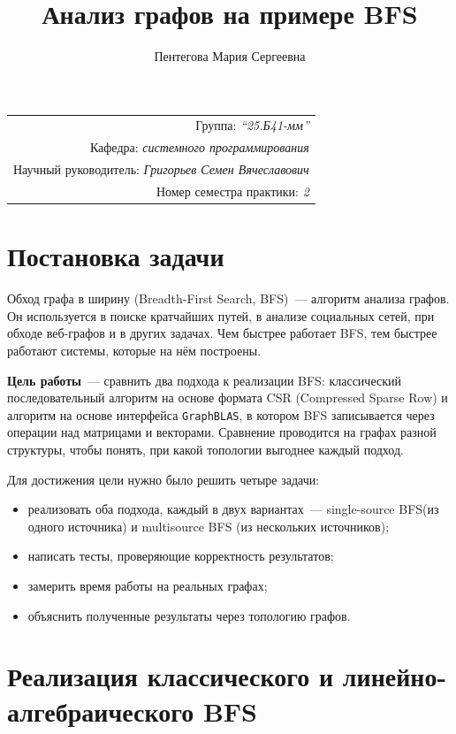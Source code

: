 \documentclass[a4paper]{article}
\title{Анализ графов на примере BFS}
\author{Пентегова Мария Сергеевна}
\date{}
\begin{document}
\maketitle
\begin{flushright}
\begin{tabular}{r}
    Группа: \emph{\enquote{25.Б41-мм}} \\
    Кафедра: \emph{системного программирования} \\
    Научный руководитель: \emph{Григорьев Семен Вячеславович} \\
    Номер семестра практики: \emph{2} \\
\end{tabular}
\end{flushright}

\section{Постановка задачи}

Обход графа в ширину (Breadth-First Search, BFS)~--- алгоритм анализа графов. Он используется в поиске кратчайших путей, в анализе социальных сетей, при обходе веб-графов и в других задачах. Чем быстрее работает BFS, тем быстрее работают системы, которые на нём построены.

\textbf{Цель работы}~--- сравнить два подхода к реализации BFS: классический последовательный алгоритм на основе формата CSR (Compressed Sparse Row) и алгоритм на основе интерфейса \texttt{GraphBLAS}, в котором BFS записывается через операции над матрицами и векторами. Сравнение проводится на графах разной структуры, чтобы понять, при какой топологии выгоднее каждый подход.

Для достижения цели нужно было решить четыре задачи:
\begin{itemize}
    \item реализовать оба подхода, каждый в двух вариантах~--- single-source BFS(из одного источника) и multisource BFS (из нескольких источников);
    \item написать тесты, проверяющие корректность результатов;
    \item замерить время работы на реальных графах;
    \item объяснить полученные результаты через топологию графов.
\end{itemize}

\section{Реализация классического и линейно-алгебраического BFS}
\end{document}
